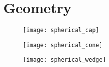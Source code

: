 \chapter{Geometry}


\begin{figure}[H]
    \centering
    \texttt{[image: spherical\_cap]}
\end{figure}
\begin{figure}[H]
    \centering
    \texttt{[image: spherical\_cone]}
\end{figure}
\begin{figure}[H]
    \centering
    \texttt{[image: spherical\_wedge]}
\end{figure}

